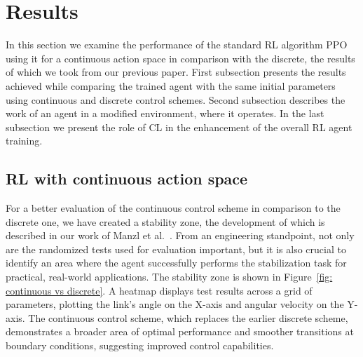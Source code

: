 \section{Results}

In this section we examine the performance of the standard RL algorithm PPO using it for a continuous action space in comparison with the discrete, the results of which we took from our previous paper. First subsection presents the results achieved while comparing the trained agent with the same initial parameters using continuous and discrete control schemes. Second subsection describes the work of an agent in a modified environment, where it operates. In the last subsection we present the role of CL in the enhancement of the overall RL agent training. 

\subsection{RL with continuous action space} \label{subsec: RL with continuous action space}
For a better evaluation of the continuous control scheme in comparison to the discrete one, we have created a stability zone, the development of which is described in our work of Manzl et al.~\cite{manzl2023relrl}. From an engineering standpoint, not only are the randomized tests used for evaluation important, but it is also crucial to identify an area where the agent successfully performs the stabilization task for practical, real-world applications. The stability zone is shown in Figure~\ref{fig: continuous vs discrete}. A heatmap displays test results across a grid of parameters, plotting the link's angle on the X-axis and angular velocity on the Y-axis. The continuous control scheme, which replaces the earlier discrete scheme, demonstrates a broader area of optimal performance and smoother transitions at boundary conditions, suggesting improved control capabilities.

